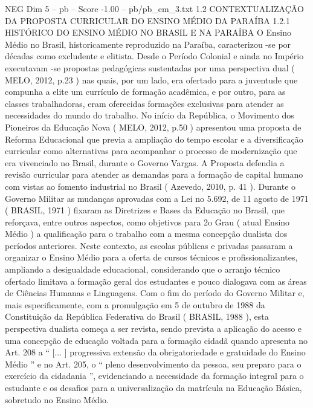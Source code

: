 \begin{textsample}{NEG Dim 5 – pb – Score -1.00 – pb/pb\_em\_3.txt}  \label{ex:f5_neg_191}
1.2 CONTEXTUALIZAÇÃO DA PROPOSTA CURRICULAR DO ENSINO MÉDIO DA PARAÍBA 1.2.1 HISTÓRICO DO ENSINO MÉDIO NO BRASIL E NA PARAÍBA O Ensino Médio no Brasil, historicamente reproduzido na Paraíba, caracterizou -se por décadas como excludente e elitista.
Desde o Período Colonial e ainda no Império executavam -se propostas pedagógicas sustentadas por uma perspectiva dual ( MELO, 2012, p.23 ) nas quais, por um lado, era ofertado para a juventude que compunha a elite um currículo de formação acadêmica, e por outro, para as classes trabalhadoras, eram oferecidas formações exclusivas para atender as necessidades do mundo do trabalho.
No início da República, o Movimento dos Pioneiros da Educação Nova ( MELO, 2012, p.50 ) apresentou uma proposta de Reforma Educacional que previa a ampliação do tempo escolar e a diversificação curricular como alternativas para acompanhar o processo de modernização que era vivenciado no Brasil, durante o Governo Vargas.
A Proposta defendia a revisão curricular para atender as demandas para a formação de capital humano com vistas ao fomento industrial no Brasil ( Azevedo, 2010, p. 41 ).
Durante o Governo Militar as mudanças aprovadas com a Lei no 5.692, de 11 agosto de 1971 ( BRASIL, 1971 ) fixaram as Diretrizes e Bases da Educação no Brasil, que reforçava, entre outros aspectos, como objetivos para 2o Grau ( atual Ensino Médio ) a qualificação para o trabalho com a mesma concepção dualista dos períodos anteriores.
Neste contexto, as escolas públicas e privadas passaram a organizar o Ensino Médio para a oferta de cursos técnicos e profissionalizantes, ampliando a desigualdade educacional, considerando que o arranjo técnico ofertado limitava a formação geral dos estudantes e pouco dialogava com as áreas de Ciências Humanas e Linguagens.
Com o fim do período do Governo Militar e, mais especificamente, com a promulgação em 5 de outubro de 1988 da Constituição da República Federativa do Brasil ( BRASIL, 1988 ), esta perspectiva dualista começa a ser revista, sendo prevista a aplicação do acesso e uma concepção de educação voltada para a formação cidadã quando apresenta no Art. 208 a “ [... ] progressiva extensão da obrigatoriedade e gratuidade do Ensino Médio ” e no Art. 205, o “ pleno desenvolvimento da pessoa, seu preparo para o exercício da cidadania ”, evidenciando a necessidade da formação integral para o estudante e os desafios para a universalização da matrícula na Educação Básica, sobretudo no Ensino Médio.

\end{textsample}
